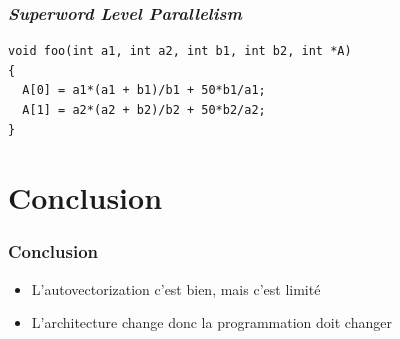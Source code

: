 \documentclass{beamer}
\begin{document}
\begin{frame}[fragile]
\frametitle{\textit{Superword Level Parallelism}}
\begin{lstlisting}
void foo(int a1, int a2, int b1, int b2, int *A) 
{
  A[0] = a1*(a1 + b1)/b1 + 50*b1/a1;
  A[1] = a2*(a2 + b2)/b2 + 50*b2/a2;
}
\end{lstlisting}
\end{frame}

\section{Conclusion}
\begin{frame}
\frametitle{Conclusion}
\begin{itemize}
\item L'autovectorization c'est bien, mais c'est limité
\item<2-> L'architecture change donc la programmation doit changer
\end{itemize}
\end{frame}
\end{document}
